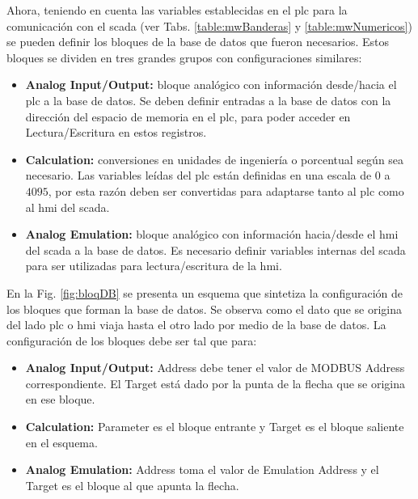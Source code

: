 Ahora, teniendo en cuenta las variables establecidas en el \gls{plc} 
para la comunicación con el \gls{scada} (ver 
Tabs. \ref{table:mwBanderas} y
\ref{table:mwNumericos}) se pueden definir los bloques de la base
de datos que fueron necesarios. Estos bloques se dividen en tres
grandes grupos con configuraciones similares:
 
\begin{itemize}
 \item \textbf{Analog Input/Output:} bloque analógico con información 
desde/hacia el 
  \gls{plc} a la base de datos. Se deben definir entradas a la base de datos
con
  la dirección del espacio de memoria en el \gls{plc}, para poder acceder en
  Lectura/Escritura en estos registros.
 \item \textbf{Calculation:}  conversiones en unidades de ingeniería o
porcentual
  según sea necesario. Las variables leídas del \gls{plc} están definidas en
  una escala de $0$ a $4095$, por esta razón deben ser convertidas para
adaptarse tanto al \gls{plc} como al \gls{hmi} del \gls{scada}.
 \item \textbf{Analog Emulation:} bloque analógico con información hacia/desde
el
  \gls{hmi} del \gls{scada} a la base de datos. Es necesario definir variables 
  internas del \gls{scada} para ser utilizadas para lectura/escritura de la 
  \gls{hmi}.
\end{itemize}

En la Fig. \ref{fig:bloqDB} se presenta un esquema que sintetiza la
configuración de los bloques que forman la base de datos. Se observa
como el dato que se origina del lado \gls{plc} o \gls{hmi} viaja hasta el otro 
lado por medio de la base de datos. La configuración de los bloques debe ser tal 
que para:

\begin{itemize}
  \item \textbf{Analog Input/Output:} Address debe tener el valor de MODBUS
  Address correspondiente. El Target está dado por la punta de la flecha que se
  origina en ese bloque.
  \item \textbf{Calculation:} Parameter es el bloque entrante y Target es el
  bloque saliente en el esquema.
  \item \textbf{Analog Emulation:} Address toma el valor de Emulation Address y
  el Target es el bloque al que apunta la flecha. 
\end{itemize}



